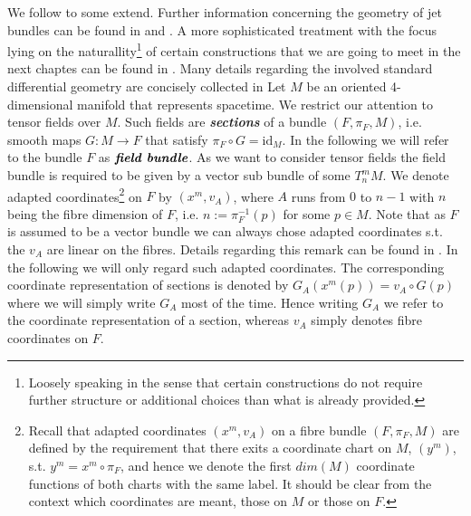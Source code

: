 \documentclass[a4paper,12pt, DIV=14, BCOR=5mm, twoside, headsepline]{scrbook}
\begin{document}
We follow \cite{1998physics...1019G} to some extend. Further information concerning the geometry of jet bundles can be found in \cite{saunders_1989} and \cite{seiler2009involution}. A more sophisticated treatment with the focus lying on the naturallity\footnote{Loosely speaking in the sense that certain constructions do not require further structure or additional choices than what is already provided.} of certain constructions that we are going to meet in the next chaptes can be found in \cite{kolar1993natural}. Many details regarding the involved standard differential geometry are concisely collected in \cite{doi:10.1142/3867}  Let $M$ be an oriented 4-dimensional manifold that represents spacetime. We restrict our attention to tensor fields over $M$. Such fields are \textit{\textbf{sections}} of a bundle $(F,\pi_F,M)$, i.e. smooth maps $G : M \rightarrow F $ that satisfy $\pi_F \circ G = \mathrm{id}_M$. In the following we will refer to the bundle $F$ as $\textit{\textbf{field bundle}}$.  As we want to consider tensor fields the field bundle is required to be given by a vector sub bundle of some $T^m_n M$. We denote adapted coordinates\footnote{Recall that adapted coordinates $(x^m,v_A)$ on a fibre bundle $(F, \pi_F, M)$ are defined by the requirement that there exits a coordinate chart on $M$, $(y^m)$, s.t. $y^m = x^m \circ \pi_F$, and hence we denote the first $dim(M)$ coordinate functions of both charts with the same label. It should be clear from the context which coordinates are meant, those on $M$ or those on $F$.} on $F$ by $(x^m,v_A)$, where $A$ runs from $0$ to $n - 1$ with $n$ being the fibre dimension of $F$, i.e. $n := \pi_F^{-1}(p)$ for some $p \in M$. Note that as $F$ is assumed to be a vector bundle we can always chose adapted coordinates s.t. the $v_A$ are linear on the fibres. Details regarding this remark can be found in \cite{saunders_1989}. In the following we will only regard such adapted coordinates. The corresponding coordinate representation of sections is denoted by $G_A(x^m(p)) = v_A \circ G (p)$ where we will simply write $G_A$ most of the time. Hence writing $G_A$ we refer to the coordinate representation of a section, whereas $v_A$ simply denotes fibre coordinates on $F$. \\
\end{document}
